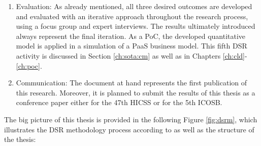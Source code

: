 \begin{enumerate}
	\item Evaluation: As already mentioned, all three desired outcomes are developed and evaluated with an iterative approach throughout the research process, using a focus group and expert interviews. The results ultimately introduced always represent the final iteration. As a \ac{PoC}, the developed quantitative model is applied in a simulation of a \ac{PaaS} business model. This fifth \ac{DSR} activity is discussed in Section \ref{ch:sota:cm} as well as in Chapters \ref{ch:cld}-\ref{ch:poc}.
	\item Communication: The document at hand represents the first publication of this research. Moreover, it is planned to submit the results of this thesis as a conference paper either for the 47th \ac{HICSS} or for the 5th \ac{ICOSB}.
\end{enumerate}

The big picture of this thesis is provided in the following Figure \ref{fig:dsrm}, which illustrates the \ac{DSR} methodology process according to \citet{Peffers2007} as well as the structure of the thesis:

\newpage


